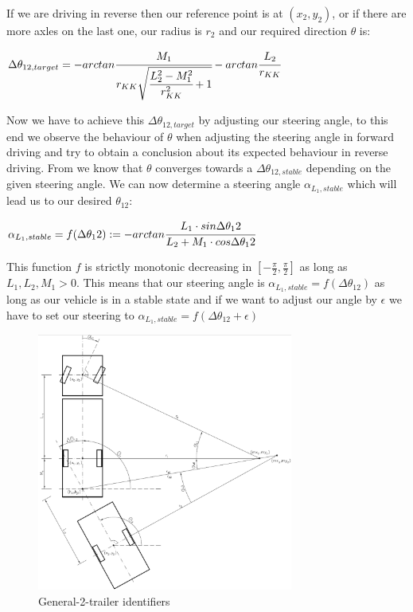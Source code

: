 If we are driving in reverse then our reference point is at $(x_2,y_2)$, or if there are more axles on the last one, our radius is $r_2$ and our required direction $\theta$ is:

\begin{center}
$\Delta \theta_{12,target}=-arctan \cfrac{M_1}{r_{KK} \sqrt{\cfrac{L_2^2-M^2_1}{r^2_{KK}}+1}}-arctan \cfrac{L_2}{r_{KK}}$
\end{center}

Now we have to achieve this $\Delta \theta_{12,target}$ by adjusting our steering angle, to this end we observe the behaviour of $\theta$ when adjusting the steering angle in forward driving and try to obtain a conclusion about its expected behaviour in reverse driving. From \cite{12} we know that $\theta$ converges towards a $\Delta \theta_{12,stable}$ depending on the given steering angle. We can now determine a steering angle $\alpha_{L_1,stable}$ which will lead us to our desired $\theta_12$:

\begin{center}
$\alpha_{L_1,stable}=f(\Delta \theta_12):=-arctan \cfrac{L_1 \cdot sin \Delta \theta_12}{L_2+M_1 \cdot cos \Delta \theta_12}$
\end{center}

This function $f$ is strictly monotonic decreasing in $\left[- \tfrac{\pi}{2},\tfrac{\pi}{2} \right]$ as long as $L_1, L_2, M_1 >0$. This means that our steering angle is $\alpha_{L_1,stable}=f(\Delta \theta_12)$ as long as our vehicle is in a stable state and if we want to adjust our angle by $\epsilon$ we have to set our steering to $\alpha_{L_1,stable}=f(\Delta \theta_12+\epsilon)$


\begin{figure}[h]
\centering
\includegraphics[width=0.75\textwidth]{./Chapters/Figures/vehicle_kinematic.png}
\caption{General-2-trailer identifiers\label{pic:vehicle_kinematic}}
\end{figure}



